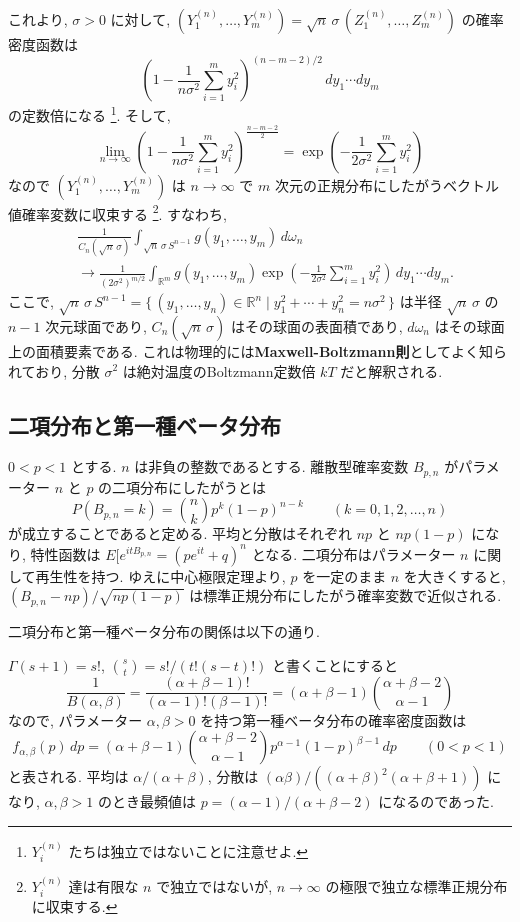 \documentclass[12pt,twoside]{jarticle}
\newcommand\R{{\mathbb R}} %
\theoremstyle{jplain}
\theoremstyle{jplain}
\theoremstyle{jplain}
\numberwithin{theorem}{section}
\numberwithin{equation}{section}
\numberwithin{figure}{section}
\numberwithin{table}{section}
\begin{document}
これより, $\sigma>0$ に対して, \(
 (Y^{(n)}_1,\ldots,Y^{(n)}_m)
 =\sqrt{n}\,\sigma\,(Z^{(n)}_1,\ldots,Z^{(n)}_m)
\) の確率密度函数は
\[
\left(1-\frac{1}{n\sigma^2}\sum_{i=1}^m y_i^2 \right)^{(n-m-2)/2}\,dy_1\cdots dy_m
\]
の定数倍になる%
\footnote{$Y^{(n)}_i$ たちは独立ではないことに注意せよ.}. そして,
\[
\lim_{n\to\infty}
\left(1-\frac{1}{n\sigma^2}\sum_{i=1}^m y_i^2 \right)^{\frac{n-m-2}{2}}
=\exp\left( -\frac{1}{2\sigma^2} \sum_{i=1}^m y_i^2 \right)
\]
なので $(Y^{(n)}_1,\ldots,Y^{(n)}_m)$ は $n\to\infty$ で
$m$ 次元の正規分布にしたがうベクトル値確率変数に収束する%
\footnote{$Y^{(n)}_i$ 達は有限な $n$ で独立ではないが, 
$n\to\infty$ の極限で独立な標準正規分布に収束する.}.
すなわち, 
\begin{align*}
&
\frac{1}{C_n(\sqrt{n}\,\sigma)}
\int_{\sqrt{n}\,\sigma\,S^{n-1}} g(y_1,\ldots,y_m) \,d\omega_n
\\ &
\longrightarrow
\frac{1}{(2\sigma^2)^{m/2}}
\int_{\R^m} g(y_1,\ldots,y_m)
\exp\left( -\frac{1}{2\sigma^2}\sum_{i=1}^my_i^2 \right)\,dy_1\cdots dy_m.
\end{align*}
ここで, \(
 \sqrt{n}\,\sigma\,S^{n-1}
 =\{\,(y_1,\ldots,y_n)\in\R^n\mid y_1^2+\cdots+y_n^2=n\sigma^2 \,\}
\) は半径 $\sqrt{n}\,\sigma$ の $n-1$ 次元球面であり, 
$C_n(\sqrt{n}\,\sigma)$ はその球面の表面積であり, 
$d\omega_n$ はその球面上の面積要素である.
これは物理的には{\bf Maxwell-Boltzmann則}としてよく知られており, 
分散 $\sigma^2$ は絶対温度のBoltzmann定数倍 $kT$ だと解釈される.


\subsection{二項分布と第一種ベータ分布}
\label{sec:Bin-Beta}

$0<p<1$ とする. 
$n$ は非負の整数であるとする.
離散型確率変数 $B_{p,n}$ がパラメーター $n$ と $p$ の二項分布にしたがうとは
\[
P(B_{p,n}=k) = \binom{n}{k}p^k(1-p)^{n-k}
\qquad (k=0,1,2,\ldots,n)
\]
が成立することであると定める.  平均と分散はそれぞれ $np$ と $np(1-p)$ になり, 
特性函数は $E[e^{itB_{p,n}}=(pe^{it}+q)^n$ となる.  
二項分布はパラメーター $n$ に関して再生性を持つ.
ゆえに中心極限定理より, $p$ を一定のまま $n$ を大きくすると, 
$(B_{p,n}-np)/\sqrt{np(1-p)}$ は標準正規分布にしたがう確率変数で近似される.

二項分布と第一種ベータ分布の関係は以下の通り.

$\Gamma(s+1)=s!$, $\binom{s}{t}=s!/(t!(s-t)!)$ と書くことにすると
\[
\frac{1}{B(\alpha,\beta)}
=\frac{(\alpha+\beta-1)!}{(\alpha-1)!(\beta-1)!}
=(\alpha+\beta-1)\binom{\alpha+\beta-2}{\alpha-1}
\]
なので, パラメーター $\alpha,\beta>0$ を持つ第一種ベータ分布の確率密度函数は 
\[
f_{\alpha,\beta}(p)\,dp
=(\alpha+\beta-1)\binom{\alpha+\beta-2}{\alpha-1} p^{\alpha-1}(1-p)^{\beta-1}\,dp
\qquad (0<p<1)
\]
と表される. 
平均は $\alpha/(\alpha+\beta)$, 
分散は $(\alpha\beta)/((\alpha+\beta)^2(\alpha+\beta+1))$ になり, 
$\alpha,\beta>1$ のとき最頻値は $p=(\alpha-1)/(\alpha+\beta-2)$ になるのであった.
\end{document}
